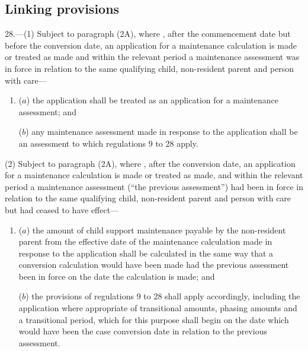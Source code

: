 \documentclass[12pt,a4paper]{article}
\begin{document}

\subsection[28. Linking provisions]{Linking provisions}

28.---(1)  
Subject to paragraph (2A), where%
, after the commencement date but before the conversion date, an application for a maintenance calculation is made or treated as made and within the relevant period a maintenance assessment was in force in relation to the same qualifying child, non-resident parent and person with care—
\begin{enumerate}\item[]
($a$) the application shall be treated as an application for a maintenance assessment; and

($b$) any maintenance assessment made in response to the application shall be an assessment to which regulations 9 to 28 apply.
\end{enumerate}

(2) 
Subject to paragraph (2A), where%
, after the conversion date, an application for a maintenance calculation is made or treated as made, and within the relevant period a maintenance assessment (“the previous assessment”) had been in force in relation to the same qualifying child, non-resident parent and person with care but had ceased to have effect—
\begin{enumerate}\item[]
($a$) the amount of child support maintenance payable by the non-resident parent from the effective date of the maintenance calculation made in response to the application shall be calculated in the same way that a conversion calculation would have been made had the previous assessment been in force on the date the calculation is made; and

($b$) the provisions of regulations 9 to 28 shall apply accordingly, including the application where appropriate of transitional amounts, phasing amounts and a transitional period, which for this purpose shall begin on the date which would have been the case conversion date in relation to the previous assessment.
\end{enumerate}
\end{document}
